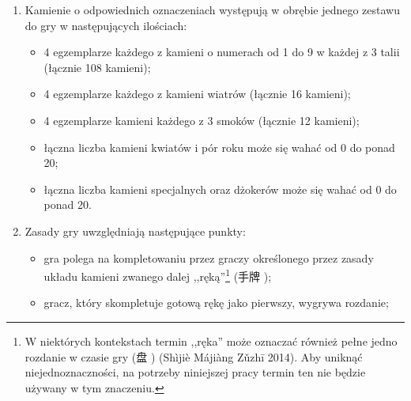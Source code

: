 \begin{enumerate}[label={\alph*)}]
\begin{itemize}
	  \item 3 smoki (biały (白 ), zielony (發\footnotemark[2]
	  ) i czerwony (中 )); dopuszczalny jest także wariant,
	  w którym zamiast smoka zielonego jest smok bez przydzielonej mu
	  barwy\footnote{,,3 Smoki'' w kolorach białym, zielonym i czerwonym to
	  zasadniczo termin zachodni, nie chiński.
	  Chińczycy używają określenia ,,3 '' (三元牌 ). We wczesnych zestawach do gry w madżonga występował jednakże
	  kamień oznaczany znakiem smoka -- 龍\footnotemark[2].} (龍\footnotemark[2]
	  ), a zamiast smoka czerwonego -- feniks (鳳\footnotemark[2] );
	  \item opcjonalnie kwiaty i/lub pory roku w różnej ilości;
	  \item opcjonalnie dżoker lub inne kamienie specjalne.
	\end{itemize}
\item Kamienie o odpowiednich oznaczeniach występują w obrębie jednego zestawu
do gry w następujących ilościach:
	\begin{itemize}
	  \item 4 egzemplarze każdego z kamieni o numerach od 1 do 9 w każdej z 3 talii
	  (łącznie 108 kamieni);
	  \item 4 egzemplarze każdego z kamieni wiatrów (łącznie 16 kamieni);
	  \item 4 egzemplarze kamieni każdego z 3 smoków (łącznie 12 kamieni);
	  \item łączna liczba kamieni kwiatów i pór roku może się wahać od 0 do ponad
	  20;
	  \item łączna liczba kamieni specjalnych oraz dżokerów może się wahać od
	0 do ponad 20.
	\end{itemize} 
\item Zasady gry uwzględniają następujące punkty:
	\begin{itemize}
	  \item gra polega na kompletowaniu przez graczy określonego przez zasady
	  układu kamieni zwanego dalej ,,ręką''\footnote{\label{reka}W niektórych
	  kontekstach termin ,,ręka'' może oznaczać również pełne jedno rozdanie w czasie gry (盘
	  ) (Shìjiè Májiàng Zǔzhī 2014). Aby uniknąć niejednoznaczności,
	  na potrzeby niniejszej pracy termin ten nie będzie używany w tym znaczeniu.}
	  (手牌 );
	  \item gracz, który skompletuje gotową rękę jako pierwszy, wygrywa rozdanie;

\end{itemize}
\end{enumerate}
